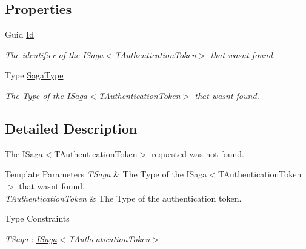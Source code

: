 \subsection*{Properties}
\begin{DoxyCompactItemize}
\item 
Guid \hyperlink{classCqrs_1_1Domain_1_1Exceptions_1_1SagaNotFoundException_a0493324fdfb3ffd3225cd28c4d03edfc_a0493324fdfb3ffd3225cd28c4d03edfc}{Id}
\begin{DoxyCompactList}\small\item\em The identifier of the I\+Saga$<$\+T\+Authentication\+Token$>$ that wasn\textquotesingle{}t found. \end{DoxyCompactList}\item 
Type \hyperlink{classCqrs_1_1Domain_1_1Exceptions_1_1SagaNotFoundException_aec80a2d55dc17dd78eec5c7b77a67b2f_aec80a2d55dc17dd78eec5c7b77a67b2f}{Saga\+Type}
\begin{DoxyCompactList}\small\item\em The Type of the I\+Saga$<$\+T\+Authentication\+Token$>$ that wasn\textquotesingle{}t found. \end{DoxyCompactList}\end{DoxyCompactItemize}


\subsection{Detailed Description}
The I\+Saga$<$\+T\+Authentication\+Token$>$ requested was not found. 


\begin{DoxyTemplParams}{Template Parameters}
{\em T\+Saga} & The Type of the I\+Saga$<$\+T\+Authentication\+Token$>$ that wasn\textquotesingle{}t found.\\
\hline
{\em T\+Authentication\+Token} & The Type of the authentication token.\\
\hline
\end{DoxyTemplParams}
\begin{Desc}
\item[Type Constraints]\begin{description}
\item[{\em T\+Saga} : {\em \hyperlink{interfaceCqrs_1_1Domain_1_1ISaga}{I\+Saga}$<$T\+Authentication\+Token$>$}]\end{description}
\end{Desc}


